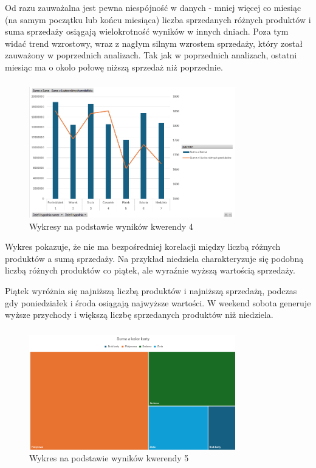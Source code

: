 \documentclass[a4paper,12pt]{article}
\begin{document}
Od razu zauważalna jest pewna niespójność w danych - mniej więcej co miesiąc (na samym początku lub końcu miesiąca) liczba sprzedanych różnych produktów i suma sprzedaży osiągają wielokrotność wyników w innych dniach. Poza tym widać trend wzrostowy, wraz z nagłym silnym wzrostem sprzedaży, który został zauważony w poprzednich analizach. Tak jak w poprzednich analizach, ostatni miesiąc ma o okolo połowę niższą sprzedaż niż poprzednie.

\subsubsection{}

\begin{figure}[H]
    \centering
    \includegraphics[width=0.8\textwidth]{images/excel/04.png}
    \caption{Wykresy na podstawie wyników kwerendy 4}
\end{figure}

Wykres pokazuje, że nie ma bezpośredniej korelacji między liczbą różnych produktów a sumą sprzedaży. Na przykład niedziela charakteryzuje się podobną liczbą różnych produktów co piątek, ale wyraźnie wyższą wartością sprzedaży.

Piątek wyróżnia się najniższą liczbą produktów i najniższą sprzedażą, podczas gdy poniedziałek i środa osiągają najwyższe wartości. W weekend sobota generuje wyższe przychody i większą liczbę sprzedanych produktów niż niedziela.

\subsubsection{}

\begin{figure}[H]
    \centering
    \includegraphics[width=0.8\textwidth]{images/excel/05.png}
    \caption{Wykres na podstawie wyników kwerendy 5}
\end{figure}
\end{document}
